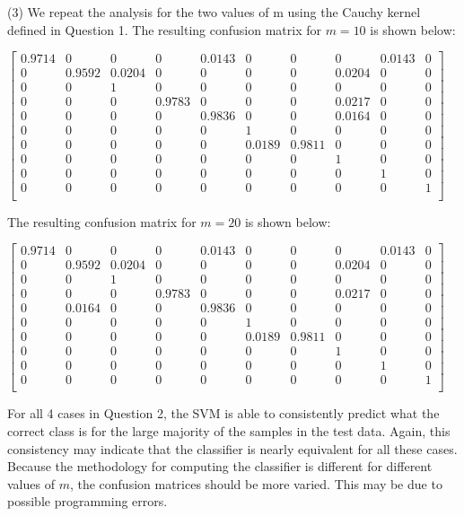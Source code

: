 (3) We repeat the analysis for the two values of m using the Cauchy kernel defined in Question 1. The resulting confusion matrix for $m = 10$ is shown below:
\begin{center}
    $\begin{bmatrix}
        0.9714 & 0 & 0 & 0 & 0.0143 & 0 & 0 & 0 & 0.0143 & 0 \\
        0 & 0.9592 & 0.0204 & 0 & 0 & 0 & 0 & 0.0204 & 0 & 0 \\
        0 & 0 & 1 & 0 & 0 & 0 & 0 & 0 & 0 & 0 \\
        0 & 0 & 0 & 0.9783 & 0 & 0 & 0 & 0.0217 & 0 & 0 \\
        0 & 0 & 0 & 0 & 0.9836 & 0 & 0 & 0.0164 & 0 & 0 \\
        0 & 0 & 0 & 0 & 0 & 1 & 0 & 0 & 0 & 0 \\
        0 & 0 & 0 & 0 & 0 & 0.0189 & 0.9811 & 0 & 0 & 0 \\
        0 & 0 & 0 & 0 & 0 & 0 & 0 & 1 & 0 & 0 \\
        0 & 0 & 0 & 0 & 0 & 0 & 0 & 0 & 1 & 0 \\
        0 & 0 & 0 & 0 & 0 & 0 & 0 & 0 & 0 & 1 \\
    \end{bmatrix}$
\end{center}
The resulting confusion matrix for $m = 20$ is shown below:
\begin{center}
    $\begin{bmatrix}
        0.9714 & 0 & 0 & 0 & 0.0143 & 0 & 0 & 0 & 0.0143 & 0 \\
        0 & 0.9592 & 0.0204 & 0 & 0 & 0 & 0 & 0.0204 & 0 & 0 \\
        0 & 0 & 1 & 0 & 0 & 0 & 0 & 0 & 0 & 0 \\
        0 & 0 & 0 & 0.9783 & 0 & 0 & 0 & 0.0217 & 0 & 0 \\
        0 & 0.0164 & 0 & 0 & 0.9836 & 0 & 0 & 0 & 0 & 0 \\
        0 & 0 & 0 & 0 & 0 & 1 & 0 & 0 & 0 & 0 \\
        0 & 0 & 0 & 0 & 0 & 0.0189 & 0.9811 & 0 & 0 & 0 \\
        0 & 0 & 0 & 0 & 0 & 0 & 0 & 1 & 0 & 0 \\
        0 & 0 & 0 & 0 & 0 & 0 & 0 & 0 & 1 & 0 \\
        0 & 0 & 0 & 0 & 0 & 0 & 0 & 0 & 0 & 1 \\
    \end{bmatrix}$
\end{center}
For all 4 cases in Question 2, the SVM is able to consistently predict what the correct class is for the large majority of the samples in the test data. Again, this consistency may indicate that the classifier is nearly equivalent for all these cases. Because the methodology for computing the classifier is different for different values of $m$, the confusion matrices should be more varied. This may be due to possible programming errors.